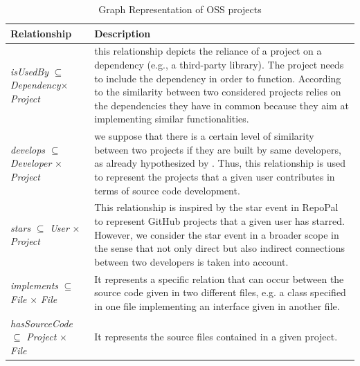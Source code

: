  
 \begin{table}[h!]
 	\centering
 	\begin{tabular}{|p{5.4cm}|p{8cm}|}  \hline
 		{\bf Relationship} & {\bf Description} \\  \hline
 		\textit{isUsedBy} $\subseteq$ \textit{Dependency}$\times$\textit{Project} & this relationship depicts the reliance of a project on a dependency (e.g., a third-party library). The project needs to include the dependency in order to function. According to \cite{McMillan:2012:DSS:2337223.2337267,6671293} the similarity between two considered projects relies on the dependencies they have in common because they aim at implementing similar functionalities.\\ \hline
 		\textit{develops} $\subseteq$ \textit{Developer} $\times$ \textit{Project} & we suppose that there is a certain level of similarity between two projects if they are built by same developers, as already hypothesized by \cite{Chen:2015:SFD:2684822.2685305}. Thus, this relationship is used to represent the projects that a given user contributes in terms of source code development.\\ \hline
 		\textit{stars} $\subseteq$ \textit{User} $\times$ \textit{Project} & This relationship is inspired by the star event in RepoPal \cite{10.1109/SANER.2017.7884605} to represent GitHub projects that a given user has starred. However, we consider the star event in a broader scope in the sense that not only direct but also indirect connections between two developers is taken into account.\\ \hline
 		\textit{implements} $\subseteq$ \textit{File} $\times$ \textit{File} & It represents a specific relation that can occur between the source code given in two different files, e.g. a class specified in one file implementing an interface given in another file.	\\ \hline
 		\textit{hasSourceCode}  $\subseteq$ \textit{Project} $\times$ \textit{File} & It represents the source files contained in a given project.\\\hline
 	\end{tabular}
 	\caption[Relationships]{Graph Representation of OSS projects}
 	\label{tab:Representation}
 \end{table}
 










